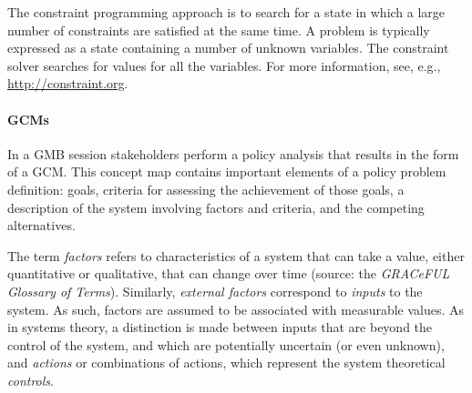 The constraint programming approach is to search for a state in which
a large number of constraints are satisfied at the same time.
%
A problem is typically expressed as a state containing a number of
unknown variables.
%
The constraint solver searches for values for all the variables.
%
For more information, see, e.g., \url{http://constraint.org}.

\paragraph{\acfp{GCM}}
In a \acl{GMB} session stakeholders perform a policy analysis that
results in the form of a \acl{GCM}.
%
This concept map contains important elements of a policy problem
definition: goals, criteria for assessing the achievement of those
goals, a description of the system involving factors and criteria, and
the competing alternatives.

The term \emph{factors} refers to characteristics of a system that can
take a value, either quantitative or qualitative, that can change over
time (source: the \emph{GRACeFUL Glossary of Terms}).
%
Similarly, \emph{external factors} correspond to \emph{inputs} to the
system.
%
As such, factors are assumed to be associated with measurable
values.
%
As in systems theory, a distinction is made between inputs that are
beyond the control of the system, and which are potentially uncertain
(or even unknown), and \emph{actions} or combinations of actions,
which represent the system theoretical \emph{controls}.

